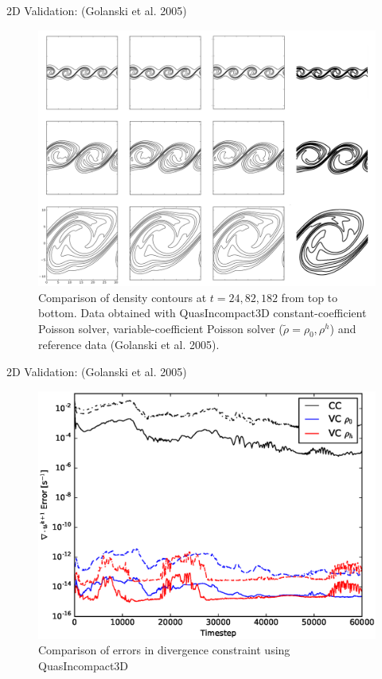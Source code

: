 \documentclass[presentation]{beamer}
\begin{document}
\begin{frame}[label=sec-2]{2D Validation: (Golanski et al. 2005)}
\begin{figure}[htb]
\centering
\includegraphics[width=0.75\linewidth]{./figures/golanski2d-rho.png}
\caption{Comparison of density contours at $t=24,82,182$ from top to bottom. Data obtained with QuasIncompact3D constant-coefficient Poisson solver, variable-coefficient Poisson solver ($\widetilde{\rho} = \rho_0, \rho^h$) and reference data (Golanski et al. 2005).}
\end{figure}
\end{frame}

\begin{frame}[label=sec-3]{2D Validation: (Golanski et al. 2005)}
\begin{figure}[htb]
\centering
\includegraphics[width=0.75\linewidth]{./figures/err_divu.eps}
\caption{Comparison of errors in divergence constraint using QuasIncompact3D}
\end{figure}
\end{frame}
\end{document}
